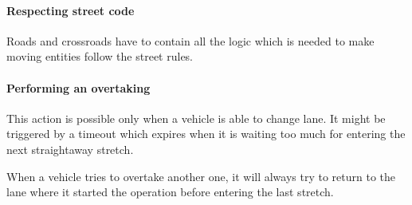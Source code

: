 \paragraph{Respecting street code} Roads and crossroads have to contain
all the logic which is needed to make moving entities follow the street rules.

\paragraph{Performing an overtaking} This action is possible only when a
vehicle is able to change lane. It might be triggered by a timeout which
expires when it is waiting too much for entering the next straightaway stretch.

When a vehicle tries to overtake another one, it will always try to return to
the lane where it started the operation before entering the last stretch.


